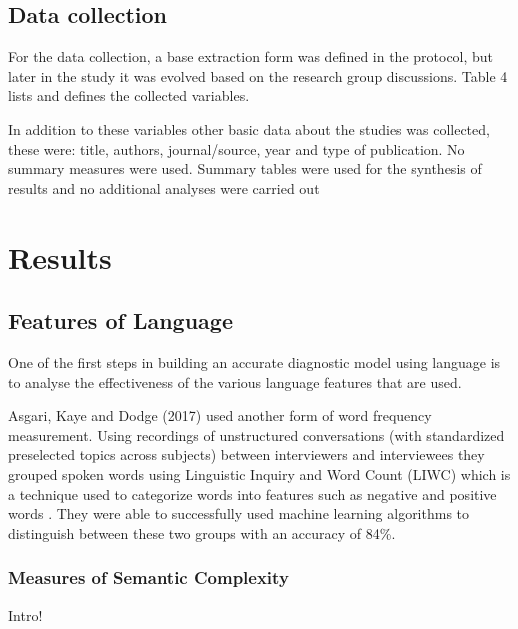 \documentclass[12pt]{article}
\begin{document}
\subsection{Data collection}
For the data collection, a base extraction form was defined in the protocol, but later in the study it was evolved based on the research group discussions. Table 4 lists and defines the collected variables.


In addition to these variables other basic data about the studies was collected, these were: title, authors, journal/source, year and type of publication. No summary measures were used. Summary tables were used for the synthesis of results and no additional analyses were carried out

\section{Results}\label{results}
\subsection{Features of Language}
One of the first steps in building an accurate diagnostic model using language is to analyse the effectiveness of the various language features that are used.

\par
Asgari, Kaye and Dodge (2017) \cite{Asgari2017} used another form of word frequency measurement. Using recordings of unstructured conversations (with standardized preselected topics across subjects) between interviewers and interviewees they grouped spoken words using Linguistic Inquiry and Word Count (LIWC) which is a technique used to categorize words into features such as negative and positive words \cite{Pennebaker2015}. They were able to successfully used machine learning algorithms to distinguish between these two groups with an accuracy of 84\%.
\subsubsection{Measures of Semantic Complexity}
Intro!
\end{document}
